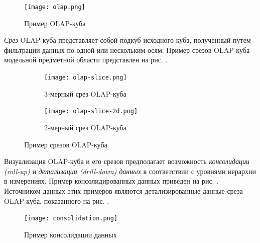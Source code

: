 \begin{figure}[h]
  \centering
  \texttt{[image: olap.png]}
  \caption{Пример OLAP-куба}
  \label{olap}
\end{figure}

\textit{Срез} OLAP-куба представляет собой подкуб исходного куба, полученный путем фильтрации данных по одной или нескольким осям. Пример срезов OLAP-куба модельной предметной области представлен на рис. .

\begin{figure}[h]
  \centering
  \begin{subfigure}[h]{\textwidth}
    \texttt{[image: olap-slice.png]}
    \caption{3-мерный срез OLAP-куба}
    \label{olap-slice-3d}
  \end{subfigure} \par
  \begin{subfigure}[h]{\textwidth}
    \texttt{[image: olap-slice-2d.png]}
    \caption{2-мерный срез OLAP-куба}
    \label{olap-slice-2d}
  \end{subfigure}
  \caption{Пример срезов OLAP-куба}
  \label{olap-slice}
\end{figure}

Визуализация OLAP-куба и его срезов предполагает возможность \textit{консолидации (roll-up)} и \textit{детализации (drill-down) данных} в соответствии с уровнями иерархии в измерениях. Пример консолидированных данных приведен на рис. . Источником данных этих примеров являются детализированные данные среза OLAP-куба, показанного на рис. .

\begin{figure}[h]
  \centering
  \texttt{[image: consolidation.png]}
  \caption{Пример консолидации данных}
  \label{consolidation}
\end{figure}

